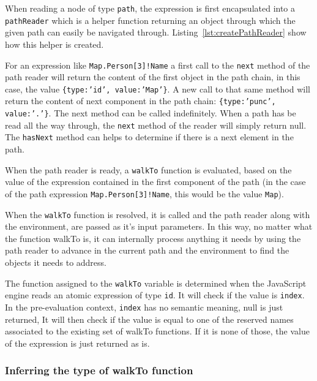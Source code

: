 

When reading a node of type \texttt{path}, the expression is first encapsulated into a \texttt{pathReader} which is a helper function returning an object through which the given path can easily be navigated through. Listing~\ref{lst:createPathReader} show how this helper is created.

For an expression like \texttt{Map.Person[3]!Name} a first call to the \texttt{next} method of the path reader will return the content of the first object in the path chain, in this case, the value \texttt{\{type:'id’, value:’Map’\}}. A new call to that same method will return the content of next component in the path chain: \texttt{\{type:'punc’, value:’.’\}}. The next method can be called indefinitely. When a path has be read all the way through, the \texttt{next} method of the reader will simply return null. The \texttt{hasNext} method can helps to determine if there is a next element in the path.

When the path reader is ready, a \texttt{walkTo} function is evaluated, based on the value of the expression contained in the first component of the path (in the case of the path expression \texttt{Map.Person[3]!Name}, this would be the value \texttt{Map}).

When the \texttt{walkTo} function is resolved, it is called and the path reader along with the environment, are passed as it's input parameters. In this way, no matter what the function walkTo is, it can internally process anything it needs by using the path reader to advance in the current path and the environment to find the objects it needs to address.

The function assigned to the \texttt{walkTo} variable is determined when the JavaScript engine reads an atomic expression of type \texttt{id}. It will check if the value is \texttt{index}. In the pre-evaluation context, \texttt{index} has no semantic meaning, null is just returned, It will then check if the value is equal to one of the reserved names associated to the existing set of walkTo functions. If it is none of those, the value of the expression is just returned as is.

\subsubsection{Inferring the type of walkTo function}

